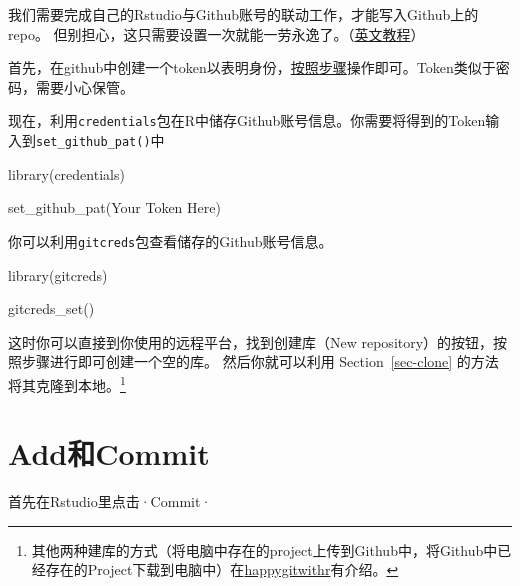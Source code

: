 \documentclass[
  letterpaper,
  DIV=11,
  numbers=noendperiod,
  oneside]{scrreprt}
\newenvironment{Shaded}{}{}
\newcommand{\FunctionTok}[1]{\textcolor[rgb]{0.44,0.26,0.76}{#1}}
\newcommand{\NormalTok}[1]{\textcolor[rgb]{0.14,0.16,0.18}{#1}}
\begin{document}
我们需要完成自己的Rstudio与Github账号的联动工作，才能写入Github上的repo。
但别担心，这只需要设置一次就能一劳永逸了。（\href{https://happygitwithr.com/credential-caching.html\#credential-caching}{英文教程}）

首先，在github中创建一个token以表明身份，\href{https://docs.github.com/en/free-pro-team@latest/github/authenticating-to-github/creating-a-personal-access-token}{按照步骤}操作即可。Token类似于密码，需要小心保管。

现在，利用\texttt{credentials}包在R中储存Github账号信息。你需要将得到的Token输入到\texttt{set\_github\_pat()}中

\begin{Shaded}
\begin{Highlighting}[]
\FunctionTok{library}\NormalTok{(credentials)}

\FunctionTok{set\_github\_pat}\NormalTok{(Your Token Here)}
\end{Highlighting}
\end{Shaded}

你可以利用\texttt{gitcreds}包查看储存的Github账号信息。

\begin{Shaded}
\begin{Highlighting}[]
\FunctionTok{library}\NormalTok{(gitcreds)}

\FunctionTok{gitcreds\_set}\NormalTok{()}
\end{Highlighting}
\end{Shaded}

这时你可以直接到你使用的远程平台，找到创建库（New
repository）的按钮，按照步骤进行即可创建一个空的库。 然后你就可以利用
Section~\ref{sec-clone} 的方法将其克隆到本地。\footnote{其他两种建库的方式（将电脑中存在的project上传到Github中，将Github中已经存在的Project下载到电脑中）在\href{https://happygitwithr.com/new-github-first.html}{happygitwithr}有介绍。}

\hypertarget{addux548ccommit}{%
\section{Add和Commit}\label{addux548ccommit}}

首先在Rstudio里点击·Commit·
\end{document}
